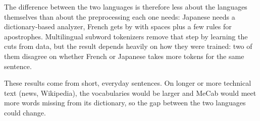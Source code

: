\documentclass[11pt,a4paper]{article}
\begin{document}
The difference between the two languages is therefore less about the
languages themselves than about the preprocessing each one needs: Japanese
needs a dictionary-based analyzer, French gets by with spaces plus a few
rules for apostrophes. Multilingual subword tokenizers remove that step
by learning the cuts from data, but the result depends heavily on how they
were trained: two of them disagree on whether French or Japanese takes more
tokens for the same sentence.

These results come from short, everyday sentences. On longer or more technical
text (news, Wikipedia), the vocabularies would be larger and MeCab would meet
more words missing from its dictionary, so the gap between the two languages
could change.
\end{document}
